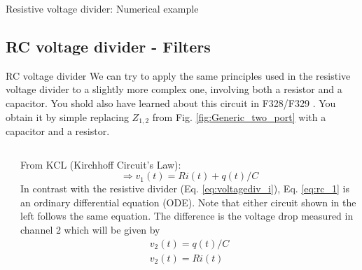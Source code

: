 \begin{frame}{Resistive voltage divider: Numerical example}

\end{frame}

\subsection{RC voltage divider - Filters}

\begin{frame}{RC voltage divider}
We can try to apply the same principles used in the resistive voltage divider to a slightly more complex one, involving both a resistor and a capacitor. You shold also have learned about this circuit in F328/F329 \cite{Walker:2008aa}. You obtain it by 			simple replacing $Z_{1,2}$ from Fig. \ref{fig:Generic_two_port} with a capacitor and a resistor.
	\begin{columns}
		\begin{column}{0.5\textwidth}
				\end{column}
		\begin{column}{0.5\textwidth}
		From KCL (Kirchhoff Circuit's Law):
			\begin{equation}
			\Rightarrow v_1(t)=R i(t)+  q(t)/C
			\label{eq:rc_1}
  			\end{equation}
  			In contrast with the resistive divider (Eq. \ref{eq:voltagediv_i}), Eq. \ref{eq:rc_1} is an ordinary differential equation (ODE). Note that either circuit shown in the left follows the same equation. The difference is the voltage drop measured in channel 2 which will be given by
		\begin{eqnarray}
		     v_2(t)=q(t)/C\label{eq:rc_v2c}\\
		     v_2(t)=R i(t)
  			\label{eq:rc_v2r}
		\end{eqnarray}
		
		\end{column}
	\end{columns}
\end{frame}

